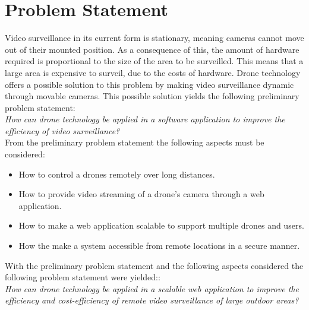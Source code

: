 \section{Problem Statement}
\label{sec:problem_definition}
Video surveillance in its current form is stationary, meaning cameras cannot move out of their mounted position.
As a consequence of this, the amount of hardware required is proportional to the size of the area to be surveilled.
This means that a large area is expensive to surveil, due to the costs of hardware.
Drone technology offers a possible solution to this problem by making video surveillance dynamic through movable cameras.
This possible solution yields the following preliminary problem statement:\\

\textit{How can drone technology be applied in a software application to improve the efficiency of video surveillance?}\\

From the preliminary problem statement the following aspects must be considered:
\begin{itemize}
	\item How to control a drones remotely over long distances.
	\item How to provide video streaming of a drone's camera through a web application.
	\item How to make a web application scalable to support multiple drones and users.
	\item How the make a system accessible from remote locations in a secure manner.
\end{itemize}


With the preliminary problem statement and the following aspects considered the following problem statement were yielded:: \\

\textit{How can drone technology be applied in a scalable web application to improve the efficiency and cost-efficiency of remote video surveillance of large outdoor areas?}